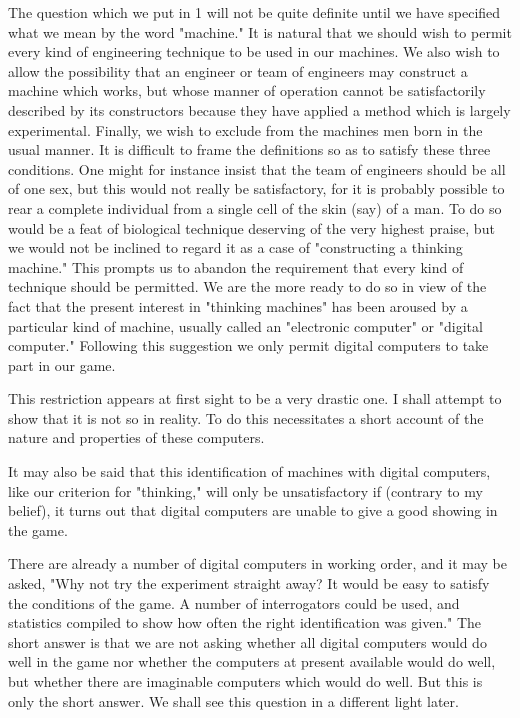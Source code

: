 \documentclass{article}
\begin{document}
The question which we put in 1 will not be quite definite until we have specified what we mean by the word "machine." It is natural that we should wish to permit every kind of engineering technique to be used in our machines. We also wish to allow the possibility that an engineer or team of engineers may construct a machine which works, but whose manner of operation cannot be satisfactorily described by its constructors because they have applied a method which is largely experimental. Finally, we wish to exclude from the machines men born in the usual manner. It is difficult to frame the definitions so as to satisfy these three conditions. One might for instance insist that the team of engineers should be all of one sex, but this would not really be satisfactory, for it is probably possible to rear a complete individual from a single cell of the skin (say) of a man. To do so would be a feat of biological technique deserving of the very highest praise, but we would not be inclined to regard it as a case of "constructing a thinking machine." This prompts us to abandon the requirement that every kind of technique should be permitted. We are the more ready to do so in view of the fact that the present interest in "thinking machines" has been aroused by a particular kind of machine, usually called an "electronic computer" or "digital computer." Following this suggestion we only permit digital computers to take part in our game.

This restriction appears at first sight to be a very drastic one. I shall attempt to show that it is not so in reality. To do this necessitates a short account of the nature and properties of these computers.

It may also be said that this identification of machines with digital computers, like our criterion for "thinking," will only be unsatisfactory if (contrary to my belief), it turns out that digital computers are unable to give a good showing in the game.

There are already a number of digital computers in working order, and it may be asked, "Why not try the experiment straight away? It would be easy to satisfy the conditions of the game. A number of interrogators could be used, and statistics compiled to show how often the right identification was given." The short answer is that we are not asking whether all digital computers would do well in the game nor whether the computers at present available would do well, but whether there are imaginable computers which would do well. But this is only the short answer. We shall see this question in a different light later.
\end{document}
